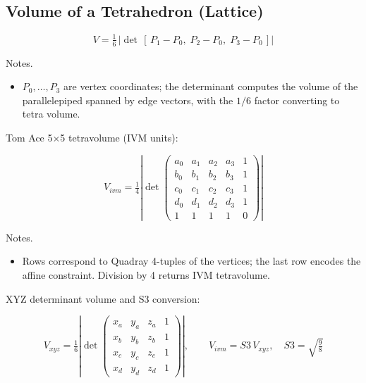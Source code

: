 \documentclass[
  10pt,
]{article}
\providecommand{\tightlist}{%
  \setlength{\itemsep}{0pt}\setlength{\parskip}{0pt}}
\begin{document}
\hypertarget{volume-of-a-tetrahedron-lattice}{%
\subsection{Volume of a Tetrahedron
(Lattice)}\label{volume-of-a-tetrahedron-lattice}}

\begin{equation}\label{eq:supp_lattice_det}
V = \tfrac{1}{6}\,\left|\det\,[\,P_1 - P_0,\; P_2 - P_0,\; P_3 - P_0\,]\right|
\end{equation}

Notes.

\begin{itemize}
\tightlist
\item
  \(P_0,\ldots,P_3\) are vertex coordinates; the determinant computes
  the volume of the parallelepiped spanned by edge vectors, with the
  \(1/6\) factor converting to tetra volume.
\end{itemize}

Tom Ace 5×5 tetravolume (IVM units):

\begin{equation}\label{eq:supp_ace5x5}
V_{ivm} = \tfrac{1}{4} \left| \det \begin{pmatrix}
 a_0 & a_1 & a_2 & a_3 & 1 \\
 b_0 & b_1 & b_2 & b_3 & 1 \\
 c_0 & c_1 & c_2 & c_3 & 1 \\
 d_0 & d_1 & d_2 & d_3 & 1 \\
  1 & 1 & 1 & 1 & 0
\end{pmatrix} \right|
\end{equation}

Notes.

\begin{itemize}
\tightlist
\item
  Rows correspond to Quadray 4-tuples of the vertices; the last row
  encodes the affine constraint. Division by 4 returns IVM tetravolume.
\end{itemize}

XYZ determinant volume and S3 conversion:

\begin{equation}\label{eq:supp_xyz_det}
V_{xyz} = \tfrac{1}{6} \left| \det \begin{pmatrix}
 x_a & y_a & z_a & 1 \\
 x_b & y_b & z_b & 1 \\
 x_c & y_c & z_c & 1 \\
  x_d & y_d & z_d & 1
\end{pmatrix} \right|, \qquad V_{ivm} = S3\, V_{xyz},\quad S3=\sqrt{\tfrac{9}{8}}
\end{equation}
\end{document}
